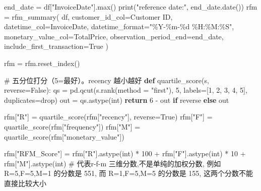 \documentclass[
]{ctexart}
\newenvironment{Shaded}{\begin{snugshade}}{\end{snugshade}}
\newcommand{\BuiltInTok}[1]{\textcolor[rgb]{0.00,0.23,0.31}{#1}}
\newcommand{\CommentTok}[1]{\textcolor[rgb]{0.37,0.37,0.37}{#1}}
\newcommand{\ControlFlowTok}[1]{\textcolor[rgb]{0.00,0.23,0.31}{\textbf{#1}}}
\newcommand{\DecValTok}[1]{\textcolor[rgb]{0.68,0.00,0.00}{#1}}
\newcommand{\KeywordTok}[1]{\textcolor[rgb]{0.00,0.23,0.31}{\textbf{#1}}}
\newcommand{\NormalTok}[1]{\textcolor[rgb]{0.00,0.23,0.31}{#1}}
\newcommand{\OperatorTok}[1]{\textcolor[rgb]{0.37,0.37,0.37}{#1}}
\newcommand{\SpecialCharTok}[1]{\textcolor[rgb]{0.37,0.37,0.37}{#1}}
\newcommand{\StringTok}[1]{\textcolor[rgb]{0.13,0.47,0.30}{#1}}
\newcommand{\VariableTok}[1]{\textcolor[rgb]{0.07,0.07,0.07}{#1}}
\begin{document}
\begin{Shaded}
\begin{Highlighting}[]
\NormalTok{end\_date }\OperatorTok{=}\NormalTok{ df[}\StringTok{"InvoiceDate"}\NormalTok{].}\BuiltInTok{max}\NormalTok{() }
\BuiltInTok{print}\NormalTok{(}\StringTok{"reference date:"}\NormalTok{, end\_date.date())}
\NormalTok{rfm }\OperatorTok{=}\NormalTok{ rfm\_summary(}
\NormalTok{    df,}
\NormalTok{        customer\_id\_col}\OperatorTok{=}\StringTok{\textquotesingle{}Customer ID\textquotesingle{}}\NormalTok{,}
\NormalTok{        datetime\_col}\OperatorTok{=}\StringTok{\textquotesingle{}InvoiceDate\textquotesingle{}}\NormalTok{,}
\NormalTok{        datetime\_format}\OperatorTok{=}\StringTok{"\%Y{-}\%m{-}}\SpecialCharTok{\%d}\StringTok{ \%H:\%M:\%S"}\NormalTok{,}
\NormalTok{        monetary\_value\_col}\OperatorTok{=}\StringTok{\textquotesingle{}TotalPrice\textquotesingle{}}\NormalTok{,}
\NormalTok{        observation\_period\_end}\OperatorTok{=}\NormalTok{end\_date,}
\NormalTok{        include\_first\_transaction}\OperatorTok{=}\VariableTok{True}
\NormalTok{)}

\NormalTok{rfm }\OperatorTok{=}\NormalTok{ rfm.reset\_index()}

\CommentTok{\# 五分位打分（5=最好）。recency 越小越好 }
\KeywordTok{def}\NormalTok{ quartile\_score(s, reverse}\OperatorTok{=}\VariableTok{False}\NormalTok{):}
\NormalTok{    qs }\OperatorTok{=}\NormalTok{ pd.qcut(s.rank(method }\OperatorTok{=} \StringTok{"first"}\NormalTok{), }\DecValTok{5}\NormalTok{, labels}\OperatorTok{=}\NormalTok{[}\DecValTok{1}\NormalTok{, }\DecValTok{2}\NormalTok{, }\DecValTok{3}\NormalTok{, }\DecValTok{4}\NormalTok{, }\DecValTok{5}\NormalTok{], duplicates}\OperatorTok{=}\StringTok{\textquotesingle{}drop\textquotesingle{}}\NormalTok{)}
\NormalTok{    out }\OperatorTok{=}\NormalTok{ qs.astype(}\BuiltInTok{int}\NormalTok{)}
    \ControlFlowTok{return} \DecValTok{6} \OperatorTok{{-}}\NormalTok{ out }\ControlFlowTok{if}\NormalTok{ reverse }\ControlFlowTok{else}\NormalTok{ out}

\NormalTok{rfm[}\StringTok{"R"}\NormalTok{] }\OperatorTok{=}\NormalTok{ quartile\_score(rfm[}\StringTok{"recency"}\NormalTok{], reverse}\OperatorTok{=}\VariableTok{True}\NormalTok{)}
\NormalTok{rfm[}\StringTok{"F"}\NormalTok{] }\OperatorTok{=}\NormalTok{ quartile\_score(rfm[}\StringTok{"frequency"}\NormalTok{])}
\NormalTok{rfm[}\StringTok{"M"}\NormalTok{] }\OperatorTok{=}\NormalTok{ quartile\_score(rfm[}\StringTok{"monetary\_value"}\NormalTok{])}

\NormalTok{rfm[}\StringTok{"RFM\_Score"}\NormalTok{] }\OperatorTok{=}\NormalTok{ rfm[}\StringTok{"R"}\NormalTok{].astype(}\BuiltInTok{int}\NormalTok{) }\OperatorTok{*} \DecValTok{100} \OperatorTok{+}\NormalTok{ rfm[}\StringTok{"F"}\NormalTok{].astype(}\BuiltInTok{int}\NormalTok{) }\OperatorTok{*} \DecValTok{10} \OperatorTok{+}\NormalTok{ rfm[}\StringTok{"M"}\NormalTok{].astype(}\BuiltInTok{int}\NormalTok{) }\CommentTok{\# 代表r{-}f{-}m 三维分数,不是单纯的加权分数, 例如 R=5,F=5,M=1 的分数是 551, 而 R=1,F=5,M=5 的分数是 155, 这两个分数不能直接比较大小}
\end{Highlighting}
\end{Shaded}
\end{document}
